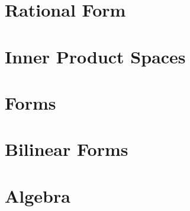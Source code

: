 \documentclass[11pt]{extarticle}
\begin{document}
\begin{multicols}{2}
   	\section{Rational Form}
   	

	\section{Inner Product Spaces}
	\section{Forms}
	\section{Bilinear Forms}
	\section{Algebra}
\end{multicols}
\end{document}
